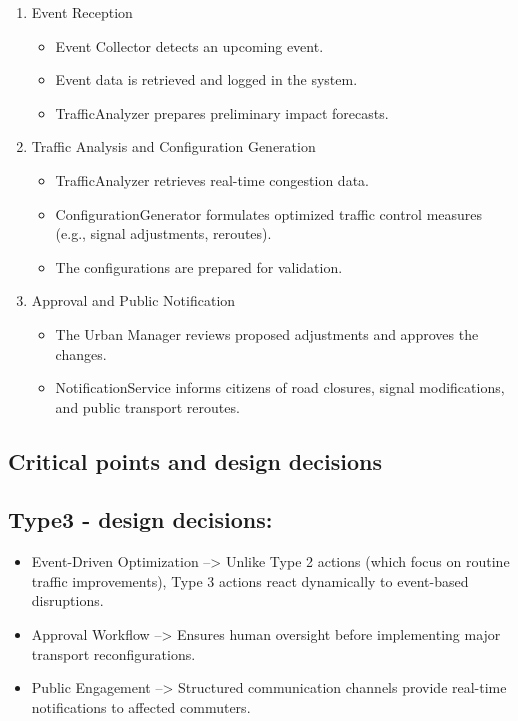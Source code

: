 \documentclass[a4paper,12pt]{article}
\begin{document}
\begin{enumerate}
    \item {Event Reception}
    \begin{itemize}
        \item Event Collector detects an upcoming event.
        \item Event data is retrieved and logged in the system.
        \item TrafficAnalyzer prepares preliminary impact forecasts.
    \end{itemize}
    \item {Traffic Analysis and Configuration Generation}
    \begin{itemize}
        \item TrafficAnalyzer retrieves real-time congestion data.
        \item ConfigurationGenerator formulates optimized traffic control measures (e.g., signal adjustments, reroutes).
        \item The configurations are prepared for validation.
    \end{itemize}
    \item {Approval and Public Notification}
    \begin{itemize}
        \item The Urban Manager reviews proposed adjustments and approves the changes.
        \item NotificationService informs citizens of road closures, signal modifications, and public transport reroutes.
    \end{itemize}
\end{enumerate}

\newpage

\subsection{Critical points and design decisions}
\subsection*{Type3 - design decisions:}
\begin{itemize}
    \item Event-Driven Optimization --> Unlike Type 2 actions (which focus on routine traffic improvements), Type 3 actions react dynamically to event-based disruptions.
    \item Approval Workflow --> Ensures human oversight before implementing major transport reconfigurations.
    \item Public Engagement -->  Structured communication channels provide real-time notifications to affected commuters.
\end{itemize}
\end{document}
